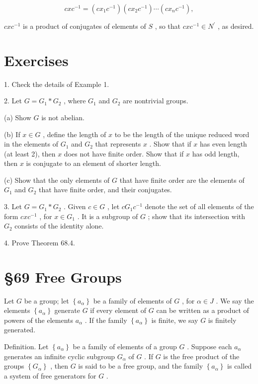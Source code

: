 \documentclass[10pt]{article}
\begin{document}
\[
{cx}{c}^{-1} = \left( {c{x}_{1}{c}^{-1}}\right) \left( {c{x}_{2}{c}^{-1}}\right) \cdots \left( {c{x}_{n}{c}^{-1}}\right) ,
\]

\({cx}{c}^{-1}\) is a product of conjugates of elements of \(S\) , so that \({cx}{c}^{-1} \in  {N}^{\prime }\) , as desired.

\section*{Exercises}

1. Check the details of Example 1.

2. Let \(G = {G}_{1} * {G}_{2}\) , where \({G}_{1}\) and \({G}_{2}\) are nontrivial groups.

(a) Show \(G\) is not abelian.

(b) If \(x \in  G\) , define the length of \(x\) to be the length of the unique reduced word in the elements of \({G}_{1}\) and \({G}_{2}\) that represents \(x\) . Show that if \(x\) has even length (at least 2), then \(x\) does not have finite order. Show that if \(x\) has odd length, then \(x\) is conjugate to an element of shorter length.

(c) Show that the only elements of \(G\) that have finite order are the elements of \({G}_{1}\) and \({G}_{2}\) that have finite order, and their conjugates.

3. Let \(G = {G}_{1} * {G}_{2}\) . Given \(c \in  G\) , let \(c{G}_{1}{c}^{-1}\) denote the set of all elements of the form \({cx}{c}^{-1}\) , for \(x \in  {G}_{1}\) . It is a subgroup of \(G\) ; show that its intersection with \({G}_{2}\) consists of the identity alone.

4. Prove Theorem 68.4.

\section*{§69 Free Groups}

Let \(G\) be a group; let \(\left\{  {a}_{\alpha }\right\}\) be a family of elements of \(G\) , for \(\alpha  \in  J\) . We say the elements \(\left\{  {a}_{\alpha }\right\}\) generate \(G\) if every element of \(G\) can be written as a product of powers of the elements \({a}_{\alpha }\) . If the family \(\left\{  {a}_{\alpha }\right\}\) is finite, we say \(G\) is finitely generated.

Definition. Let \(\left\{  {a}_{\alpha }\right\}\) be a family of elements of a group \(G\) . Suppose each \({a}_{\alpha }\) generates an infinite cyclic subgroup \({G}_{\alpha }\) of \(G\) . If \(G\) is the free product of the groups \(\left\{  {G}_{\alpha }\right\}\) , then \(G\) is said to be a free group, and the family \(\left\{  {a}_{\alpha }\right\}\) is called a system of free generators for \(G\) .
\end{document}
